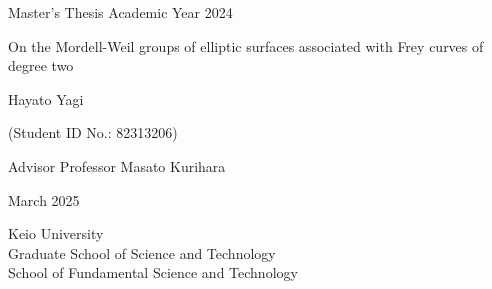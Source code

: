 \documentclass[main]{subfiles}
\begin{document}
\begin{titlepage}
    \centering
    
    \fontsize{12pt}{12pt} \selectfont
    Master's Thesis \hspace{186pt} Academic Year 2024
    \vspace{20pt}

    \fontsize{30pt}{30pt} \selectfont
    
    \vspace{20pt}
    On the Mordell-Weil groups of elliptic surfaces associated with Frey curves of degree two
    \vspace{45pt}
    
    Hayato Yagi
    \vspace{20pt}
    
    \fontsize{18pt}{18pt} \selectfont
    (Student ID No.: 82313206)
    \vspace{140pt}
    
    Advisor Professor Masato Kurihara
    \vspace{45pt}
    
    March 2025
    \vspace{45pt}
    
    Keio University \\
    Graduate School of Science and Technology \\
    School of Fundamental Science and Technology \\
    \normalsize
    
\end{titlepage}
\end{document}
